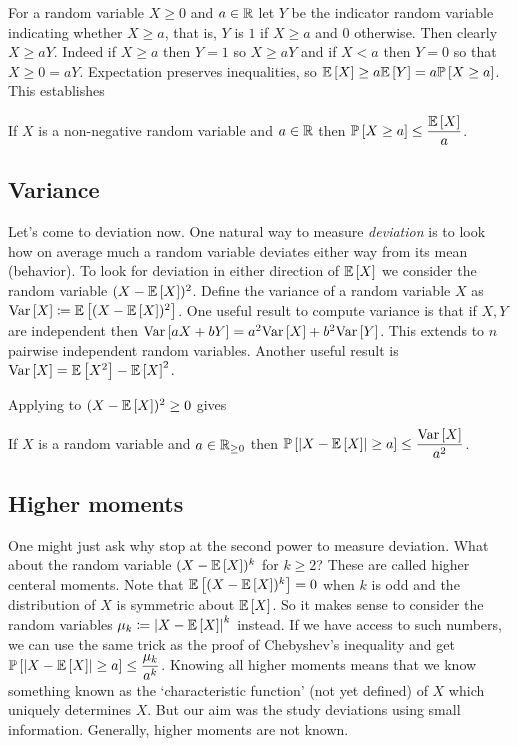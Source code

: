 For a random variable $X\ge 0$ and $a\in\mathbb{R}$ let $Y$ be the indicator random variable indicating whether $X\ge a$, that is, $Y$ is $1$ if $X\ge a$ and $0$ otherwise. Then clearly $X \ge aY$. Indeed if $X\ge a$ then $Y=1$ so $X\ge aY$ and if $X<a$ then $Y=0$ so that $X \ge 0 = aY$. Expectation preserves inequalities, so $\mathbb E\left[ X \right] \ge a\mathbb E\left[ Y \right] = a\mathbb P\left[ X\ge a \right]$. This establishes
\begin{thm}\label{thm:markov}
If $X$ is a non-negative random variable and $a\in\mathbb{R}$ then $\mathbb P\left[ X\ge a \right]\le \dfrac{\mathbb E\left[ X \right]}{a}$.
\end{thm}

\subsection{Variance}
Let's come to deviation now. One natural way to measure \textit{deviation} is to look how on average much a random variable deviates either way from its mean (behavior). To look for deviation in either direction of $\mathbb E\left[ X \right]$ we consider the random variable $(X-\mathbb E\left[ X \right])^{2}$. Define the variance of a random variable $X$ as $\text{Var}\left[ X \right] \coloneqq \mathbb E\left[ (X-\mathbb E\left[ X \right])^{2} \right]$. One useful result to compute variance is that if $X,Y$ are independent then $\text{Var}\left[ aX+bY \right] = a^{2}\text{Var}\left[ X \right] + b^{2}\text{Var}\left[ Y \right]$. This extends to $n$ pairwise independent random variables. Another useful result is $\text{Var}\left[ X \right] = \mathbb E\left[ X^{2} \right] - \mathbb E\left[ X \right]^{2}$.

Applying  to $(X-\mathbb E\left[ X \right])^{2}\ge 0$ gives 
\begin{thm}\label{thm:chebyshev}
If $X$ is a random variable and $a\in\mathbb{R}_{{\ge 0}}$ then $\mathbb P\left[ \left| X-\mathbb E\left[ X \right] \right|\ge a \right]\le \dfrac{\text{Var}\left[ X \right]}{a^{2}}$.
\end{thm}

\subsection{Higher moments}
One might just ask why stop at the second power to measure deviation. What about the random variable $(X-\mathbb E\left[ X \right])^{k}$ for $k\ge 2$? These are called higher centeral moments. Note that $\mathbb E\left[ (X-\mathbb E\left[ X \right])^{k} \right] = 0$ when $k$ is odd and the distribution of $X$ is symmetric about $\mathbb E\left[ X \right]$. So it makes sense to consider the random variables $\mu_{k} \coloneqq \left| X-\mathbb E\left[ X \right] \right|^{k}$ instead. If we have access to such numbers, we can use the same trick as the proof of Chebyshev's inequality and get $\mathbb P\left[ \left| X-\mathbb E\left[ X \right] \right|\ge a \right] \le \dfrac{\mu_{k}}{a^{k}}$. Knowing all higher moments means that we know something known as the `characteristic function' (not yet defined) of $X$ which uniquely determines $X$. But our aim was the study deviations using small information. Generally, higher moments are not known.





